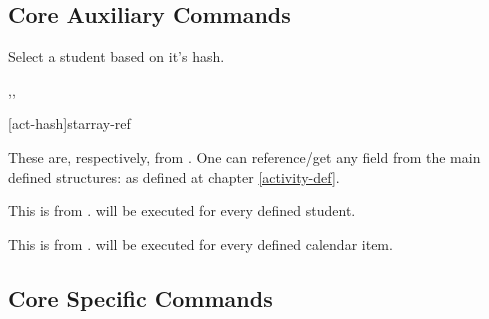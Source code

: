 \documentclass[article,nogeometry,english,tocdepth=3,secdepth=3]{ufrgscca} %
\begin{document}
\subsection{Core Auxiliary Commands}


\begin{codedescribe}[code,new=2023/11/18]{\studentselect}
	\begin{codesyntax}%
	\end{codesyntax}
Select a student based on it's hash.
\end{codedescribe}




\begin{codedescribe}[code,new=2023/11/18]{\DataFields,\eDataSet,\eDataFields}
	\begin{codesyntax}%
    \tsmacro{\eDataSet}[act-hash]{starray-ref}
	\end{codesyntax}
These are, respectively,  from . One can reference/get any field from the main  defined structures:  as defined at chapter \ref{activity-def}.
\end{codedescribe}


\begin{codedescribe}[code,new=2023/11/18]{\studentiterate}
	\begin{codesyntax}%
	\end{codesyntax}
This is  from .  will be executed for every defined student.
\end{codedescribe}

\begin{codedescribe}[code,new=2023/11/29]{\ActivityCalendarIterate}
	\begin{codesyntax}%
	\end{codesyntax}
This is  from .  will be executed for every defined calendar item.
\end{codedescribe}


\subsection{Core Specific Commands}\label{core-specific-commands}
\end{document}
